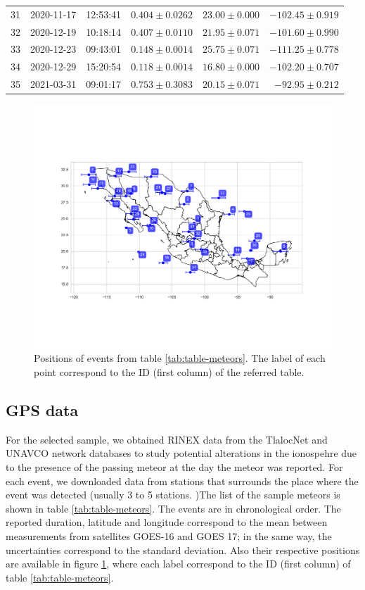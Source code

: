 \documentclass[times,twocolumn,final,authoryear]{elsarticle}
\begin{document}
\begin{table}
\begin{tabular}{|r|r|r|r|r|r|}
31 & 2020-11-17 & 12:53:41 & $0.404\pm 0.0262$ & $23.00 \pm 0.000$ & $-102.45 \pm  0.919$\\
32 & 2020-12-19 & 10:18:14 & $0.407\pm 0.0110$ & $21.95 \pm 0.071$ & $-101.60 \pm  0.990$\\
33 & 2020-12-23 & 09:43:01 & $0.148\pm 0.0014$ & $25.75 \pm 0.071$ & $-111.25 \pm  0.778$\\
34 & 2020-12-29 & 15:20:54 & $0.118\pm 0.0014$ & $16.80 \pm 0.000$ & $-102.20 \pm  0.707$\\
35 & 2021-03-31 & 09:01:17 & $0.753\pm 0.3083$ & $20.15 \pm 0.071$ & $-92.95 \pm  0.212$\\\hline
\end{tabular}
\end{table}

\begin{figure}
  \centering
  \includegraphics[width=\linewidth]{../meteors_map}
  \caption{Positions of events from table \ref{tab:table-meteors}. The label of each point correspond to the ID (first column) of the referred table.}
  \label{fig:meteors-map}
\end{figure}

\subsection{GPS data}

For the selected sample, we obtained RINEX data from the TlalocNet \citep{Cabral-Cano:2018} and UNAVCO network databases to study potential alterations in the ionospehre due to the presence of the passing meteor at the day the meteor was reported. For each event, we downloaded data from stations that surrounds the place where the event was detected (usually 3 to 5 stations. )The list of the sample meteors is shown in table \ref{tab:table-meteors}. The events are in chronological order. The reported duration, latitude and longitude correspond to the mean between measurements from satellites GOES-16 and GOES 17; in the same way, the uncertainties correspond to the standard deviation. Also their respective positions are available in figure \ref{fig:meteors-map}, where each label correspond to the ID (first column) of table \ref{tab:table-meteors}.
\end{document}
